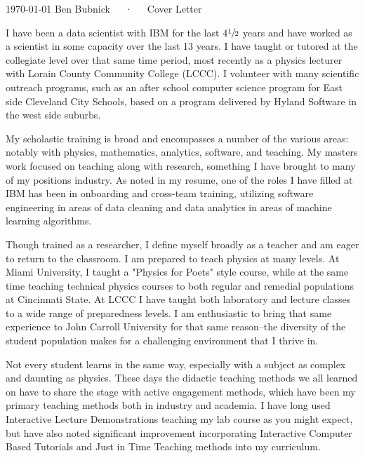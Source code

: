 \documentclass[11pt, a4paper]{awesome-cv}
\begin{document}
\makecvheader[R]

\makecvfooter
  {\today}
  {Ben Bubnick~~~·~~~Cover Letter}
  {}

\makelettertitle

\begin{cvletter}

I have been a data scientist with IBM for the last 4$\sfrac{1}{2}$ years and have worked as a scientist in some capacity over the last 13 years.  I have taught or tutored at the collegiate level over that same time period, most recently as a physics lecturer with Lorain County Community College (LCCC).  I volunteer with many scientific outreach programs, such as an after school computer science program for East side Cleveland City Schools, based on a program delivered by Hyland Software in the west side suburbs.

My scholastic training is broad and encompasses a number of the various areas: notably with physics, mathematics, analytics, software, and teaching.  My masters work focused on teaching along with research, something I have brought to many of my positions industry.  As noted in my resume, one of the roles I have filled at IBM has been in onboarding and cross-team training, utilizing software engineering in areas of data cleaning and data analytics in areas of machine learning algorithms.

Though trained as a researcher, I define myself broadly as a teacher and am eager to return to the classroom. I am prepared to teach physics at many levels.  At Miami University, I taught a "Physics for Poets" style course, while at the same time teaching technical physics courses to both regular and remedial populations at Cincinnati State.  At LCCC I have taught both laboratory and lecture classes to a wide range of preparedness levels.  I am enthusiastic to bring that same experience to John Carroll University for that same reason--the diversity of the student population makes for a challenging environment that I thrive in.

Not every student learns in the same way, especially with a subject as complex and daunting as physics.  These days the didactic teaching methods we all learned on have to share the stage with active engagement methods, which have been my primary teaching methods both in industry and academia.  I have long used Interactive Lecture Demonstrations teaching my lab course as you might expect, but have also noted significant improvement incorporating Interactive Computer Based Tutorials and Just in Time Teaching methods into my curriculum.  %

\end{cvletter}


\makeletterclosing
\end{document}
